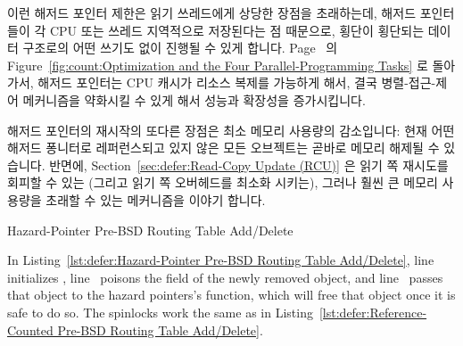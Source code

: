 이런 해저드 포인터 제한은 읽기 쓰레드에게 상당한 장점을 초래하는데, 해저드
포인터들이 각 CPU 또는 쓰레드 지역적으로 저장된다는 점 때문으로, 횡단이
횡단되는 데이터 구조로의 어떤 쓰기도 없이 진행될 수 있게 합니다.
Page~\pageref{fig:count:Optimization and the Four Parallel-Programming Tasks}
의
Figure~\ref{fig:count:Optimization and the Four Parallel-Programming Tasks}
로 돌아가서, 해저드 포인터는 CPU 캐시가 리소스 복제를 가능하게 해서, 결국
병렬-접근-제어 메커니즘을 약화시킬 수 있게 해서 성능과 확장성을 증가시킵니다.

해저드 포인터의 재시작의 또다른 장점은 최소 메모리 사용량의 감소입니다:
현재 어떤 해저드 퐁니터로 레퍼런스되고 있지 않은 모든 오브젝트는 곧바로 메모리
해제될 수 있습니다.
반면에,
Section~\ref{sec:defer:Read-Copy Update (RCU)}
은 읽기 쪽 재시도를 회피할 수 있는 (그리고 읽기 쪽 오버헤드를 최소화 시키는),
그러나 훨씬 큰 메모리 사용량을 초래할 수 있는 메커니즘을 이야기 합니다.

\begin{listing}[tbp]

\caption{Hazard-Pointer Pre-BSD Routing Table Add\slash Delete}
\label{lst:defer:Hazard-Pointer Pre-BSD Routing Table Add/Delete}
\end{listing}

\begin{lineref}
In
Listing~\ref{lst:defer:Hazard-Pointer Pre-BSD Routing Table Add/Delete},
line~ initializes ,
line~ poisons the  field of the newly removed
object, and
line~ passes that object to the hazard pointers's
 function, which will free that object once it
is safe to do so.
The spinlocks work the same as in
Listing~\ref{lst:defer:Reference-Counted Pre-BSD Routing Table Add/Delete}.
\end{lineref}
\fi

